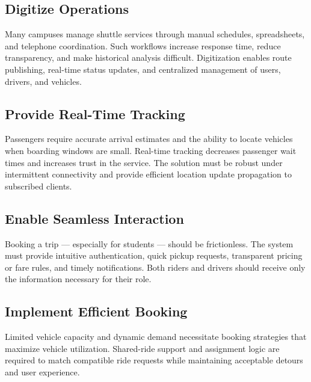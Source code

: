 \documentclass[12pt,a4paper]{article}
\begin{document}
\subsection{Digitize Operations}
Many campuses manage shuttle services through manual schedules, spreadsheets, and telephone coordination. Such workflows increase response time, reduce transparency, and make historical analysis difficult. Digitization enables route publishing, real-time status updates, and centralized management of users, drivers, and vehicles.

\subsection{Provide Real-Time Tracking}
Passengers require accurate arrival estimates and the ability to locate vehicles when boarding windows are small. Real-time tracking decreases passenger wait times and increases trust in the service. The solution must be robust under intermittent connectivity and provide efficient location update propagation to subscribed clients.

\subsection{Enable Seamless Interaction}
Booking a trip — especially for students — should be frictionless. The system must provide intuitive authentication, quick pickup requests, transparent pricing or fare rules, and timely notifications. Both riders and drivers should receive only the information necessary for their role.

\subsection{Implement Efficient Booking}
Limited vehicle capacity and dynamic demand necessitate booking strategies that maximize vehicle utilization. Shared-ride support and assignment logic are required to match compatible ride requests while maintaining acceptable detours and user experience.
\end{document}
